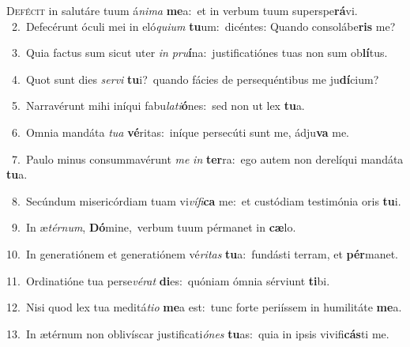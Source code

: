 \lettrine{\initial\textcolor{\initialcolor}{D}}{efécit} in salutáre tuum á\-\textit{ni}\-\textit{ma} \textbf{me}\-a:~\star et in verbum tuum superspe\-\textbf{rá}\-vi.\\
{\numbfont\textcolor{\numbcolor}{~2.}}~Defecérunt óculi mei in eló\-\textit{qui}\-\textit{um} \textbf{tu}\-um:~\star dicéntes: Quando consolábe\textbf{ris} me?\par
{\numbfont\textcolor{\numbcolor}{~3.}}~Quia factus sum sicut uter \textit{in} \textit{pru}\-\textbf{í}na:~\star justificatiónes tuas non sum ob\-\textbf{lí}\-tus.\par
{\numbfont\textcolor{\numbcolor}{~4.}}~Quot sunt dies \textit{ser}\-\textit{vi} \textbf{tu}\-i?~\star quando fácies de persequéntibus me ju\-\textbf{dí}\-cium?\par
{\numbfont\textcolor{\numbcolor}{~5.}}~Narravérunt mihi iníqui fabu\-\textit{la}\-\textit{ti}\textbf{ó}nes:~\star sed non ut lex \textbf{tu}\-a.\par
{\numbfont\textcolor{\numbcolor}{~6.}}~Omnia mandáta \textit{tu}\-\textit{a} \textbf{vé}\-ritas:~\star iníque persecúti sunt me, ádju\textbf{va} me.\par
{\numbfont\textcolor{\numbcolor}{~7.}}~Paulo minus consummavérunt \textit{me} \textit{in} \textbf{ter}\-ra:~\star ego autem non derelíqui mandáta \textbf{tu}\-a.\par
{\numbfont\textcolor{\numbcolor}{~8.}}~Secúndum misericórdiam tuam vi\-\textit{ví}\-\textit{fi}\textbf{ca} me:~\star et custódiam testimónia oris \textbf{tu}\-i.\par
{\numbfont\textcolor{\numbcolor}{~9.}}~In æ\-\textit{tér}\-\textit{num}, \textbf{Dó}\-mine,~\star verbum tuum pérmanet in \textbf{cæ}\-lo.\par
{\numbfont\textcolor{\numbcolor}{10.}}~In generatiónem et generatiónem vé\-\textit{ri}\-\textit{tas} \textbf{tu}\-a:~\star fundásti terram, et \textbf{pér}\-manet.\par
{\numbfont\textcolor{\numbcolor}{11.}}~Ordinatióne tua perse\-\textit{vé}\-\textit{rat} \textbf{di}\-es:~\star quóniam ómnia sérviunt \textbf{ti}\-bi.\par
{\numbfont\textcolor{\numbcolor}{12.}}~Nisi quod lex tua meditá\-\textit{ti}\-\textit{o} \textbf{me}\-a est:~\star tunc forte periíssem in humilitáte \textbf{me}\-a.\par
{\numbfont\textcolor{\numbcolor}{13.}}~In ætérnum non oblivíscar justificati\-\textit{ó}\-\textit{nes} \textbf{tu}\-as:~\star quia in ipsis vivifi\-\textbf{cás}\-ti me.\par

